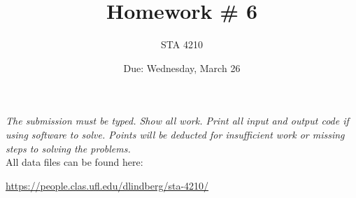 \documentclass[12pt]{article}
\begin{document}
 
 
\title{Homework \# 6}
\author{STA 4210}
\date{Due: Wednesday, March 26}
\maketitle
\noindent
{\it The submission must be typed. Show all work. Print all input and output code if using software to solve. Points will be deducted for insufficient work or missing steps to solving the problems.}\\

\noindent All data files can be found here:
\begin{center}
\url{https://people.clas.ufl.edu/dlindberg/sta-4210/}
\end{center}
\end{document}
